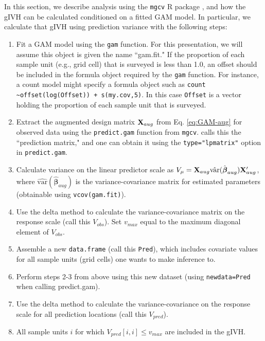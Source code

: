 \documentclass[12pt,fleqn]{article}
\begin{document}
\begin{flushleft}
In this section, we describe analysis using the \texttt{mgcv} R package \citep{Wood2006}, and how the gIVH can be calculated conditioned on a fitted GAM model.  In particular, we calculate that gIVH using prediction variance with the following steps:
\begin{enumerate}
  \item Fit a GAM model using the \texttt{gam} function.  For this  presentation, we will assume this object is given the name ``gam.fit."  If the proportion of each sample unit (e.g., grid cell) that is surveyed is less than 1.0, an offset should be included in the formula object required by the \texttt{gam} function.  For instance, a count model might specify a formula object such as \texttt{count \textasciitilde offset(log(Offset)) + s(my.cov,5)}.  In this case \texttt{Offset} is a vector holding the proportion of each sample unit that is surveyed.
  \item Extract the augmented design matrix ${\bf X}_{aug}$ from Eq. \ref{eq:GAM-aug} for observed data using the \texttt{predict.gam} function from \texttt{mgcv}.  \citet{Wood2006} calls this the ``prediction matrix," and one can obtain it using the \texttt{type="lpmatrix"} option in \texttt{predict.gam}.
  \item Calculate variance on the linear predictor scale as $V_\mu = {\bf X}_{aug} \hat{\textrm{var}}(\hat{\boldsymbol{\beta}}_{aug}){\bf X}_{aug}^\prime$, where $\hat{\textrm{var}}(\hat{\boldsymbol{\beta}}_{aug})$ is the variance-covariance matrix for estimated parameters (obtainable using \texttt{vcov(gam.fit)}).
  \item Use the delta method \citep{Dorfman1938} to calculate the variance-covariance matrix on the response scale (call this $V_{obs}$).  Set $v_{max}$ equal to the maximum diagonal element of $V_{obs}$.
  \item Assemble a new \texttt{data.frame} (call this \texttt{Pred}), which includes covariate values for all sample units (grid cells) one wants to make inference to.
  \item Perform steps 2-3 from above using this new dataset (using \texttt{newdata=Pred} when calling predict.gam).
  \item Use the delta method \citep{Dorfman1938} to calculate the variance-covariance on the response scale for all prediction locations (call this $V_{pred}$).
  \item All sample units $i$ for which $V_{pred}[i,i] \le v_{max}$ are included in the gIVH.
\end{enumerate}


\renewcommand{\refname}{Literature Cited}




\end{flushleft}
\end{document}
